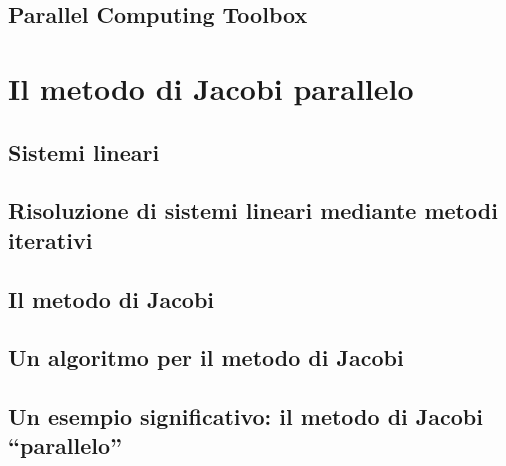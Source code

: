 \documentclass[
	a4paper,
	twoside,
	12pt
]{book}
\begin{document}
\section{Parallel Computing Toolbox}
\label{par:parallelComputingToolbox}

\nocite{TheMathworksIncGetStartedParallel}
\nocite{TheMathworksIncQuickStartParallel}
\chapter{Il metodo di Jacobi parallelo}
\label{cap:metodoJacobiParallelo}

\section{Sistemi lineari}
\label{par:sistemiLineari}

\nocite{Quarteroni2002}
\nocite{Quarteroni1997}
\section{Risoluzione di sistemi lineari mediante metodi iterativi}

\section{Il metodo di Jacobi}
\label{par:metodoJacobi}

\nocite{Bini2013}
\section{Un algoritmo per il metodo di Jacobi}
\label{par:algoritmoJacobi}

\section{Un esempio significativo: il metodo di Jacobi \enquote{parallelo}}
\label{par:applicazioneMetodoJacobi}

\nocite{TheMathworksIncUseDistributedArrays}
\end{document}
